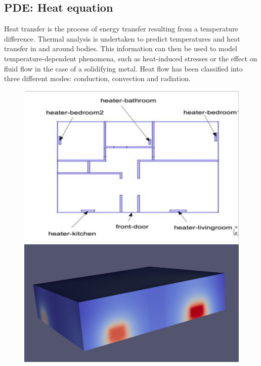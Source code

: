 \documentclass[12pt]{article}
\begin{document}
	\subsection{PDE: Heat equation}
	\label{heat_pde}
	\noindent Heat transfer is the process of energy transfer resulting from a temperature difference. 
	\newline
    \noindent Thermal analysis is undertaken to predict temperatures and heat transfer in and around bodies. This information can then be used to model temperature-dependent phenomena, such as heat-induced stresses or the effect on fluid flow in the case of a solidifying metal.  Heat flow has been classified into three different modes: conduction, convection and radiation.
    \begin{figure}[H]       
	\begin{minipage}[t]{0.45\linewidth}
		\centering
		\includegraphics[width=\linewidth]{"images/Diff_equation/heat_1.png"}
	\end{minipage} \hfill
	\begin{minipage}[t]{0.50\linewidth}
		\centering
		\includegraphics[width=\linewidth]{"images/Diff_equation/heat_2.png"}
	\end{minipage}
    \end{figure}
\end{document}
